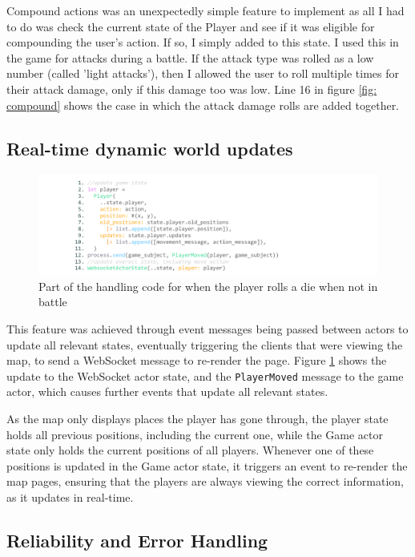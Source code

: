 \documentclass[]{final}
\begin{document}
Compound actions was an unexpectedly simple feature to implement as all I
had to do was check the current state of the Player and see if it was eligible
for compounding the user's action. If so, I simply added to this state. I used
this in the game for attacks during a battle. If the attack type was rolled as
a low number (called 'light attacks'), then I allowed the user to roll multiple
times for their attack damage, only if this damage too was low. Line 16 in figure \ref{fig: compound}
shows the case in which the attack damage rolls are added together.

\subsection{Real-time dynamic world updates}

\begin{figure}[H]
  \centering
  \includegraphics[width=\textwidth]{update_state_move.pdf}
  \caption{Part of the handling code for when the player rolls a die when not in battle}\label{fig: updatestatemove}
\end{figure}

This feature was achieved through event messages being passed between actors to
update all relevant states, eventually triggering the clients that were viewing
the map, to send a WebSocket message to re-render the page. Figure \ref{fig: updatestatemove}
shows the update to the WebSocket actor state, and the \lstinline|PlayerMoved|
message to the game actor, which causes further events that update all relevant
states.

As the map only displays places the player has gone through, the player state
holds all previous positions, including the current one, while the Game actor
state only holds the current positions of all players. Whenever one of these
positions is updated in the Game actor state, it triggers an event to re-render
the map pages, ensuring that the players are always viewing the correct
information, as it updates in real-time.

\subsection{Reliability and Error Handling}
\end{document}
